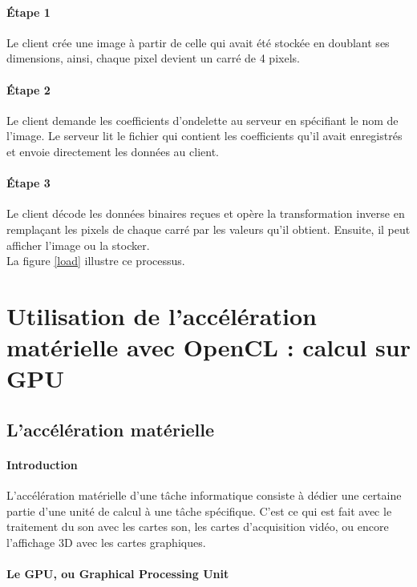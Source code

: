 \documentclass{article}
\begin{document}
\paragraph{Étape 1}

Le client crée une image à partir de celle qui avait été stockée en doublant ses dimensions, ainsi, chaque pixel devient un carré de 4 pixels.

\paragraph{Étape 2}

Le client demande les coefficients d'ondelette au serveur en spécifiant le nom de l'image. Le serveur lit le fichier qui contient les coefficients qu'il avait enregistrés et envoie directement les données au client.

\paragraph{Étape 3}

Le client décode les données binaires reçues et opère la transformation inverse en remplaçant les pixels de chaque carré par les valeurs qu'il obtient. Ensuite, il peut afficher l'image ou la stocker.\\

La figure \ref{load} illustre ce processus.


\section{Utilisation de l'accélération matérielle avec OpenCL : calcul sur GPU}

\subsection{L'accélération matérielle}

\paragraph{Introduction}
L'accélération matérielle d'une tâche informatique consiste à dédier une certaine partie d'une unité de calcul à une tâche spécifique. 
C'est ce qui est fait avec le traitement du son avec les cartes son, les cartes d'acquisition vidéo, ou encore l'affichage 3D avec les cartes graphiques.

\paragraph{Le GPU, ou Graphical Processing Unit}
\end{document}

